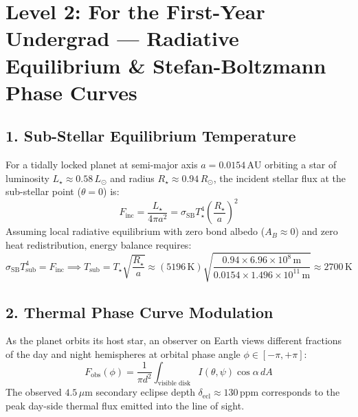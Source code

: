 \documentclass[11pt,a4paper]{article}
\begin{document}
\section*{Level 2: For the First-Year Undergrad — Radiative Equilibrium \& Stefan-Boltzmann Phase Curves}

\subsection*{1. Sub-Stellar Equilibrium Temperature}
For a tidally locked planet at semi-major axis $a = 0.0154\,\text{AU}$ orbiting a star of luminosity $L_\star \approx 0.58\,L_\odot$ and radius $R_\star \approx 0.94\,R_\odot$, the incident stellar flux at the sub-stellar point ($\theta = 0$) is:
\begin{equation}
F_{\text{inc}} = \frac{L_\star}{4\pi a^2} = \sigma_{\text{SB}} T_\star^4 \left(\frac{R_\star}{a}\right)^2
\end{equation}
Assuming local radiative equilibrium with zero bond albedo ($A_B \approx 0$) and zero heat redistribution, energy balance requires:
\begin{equation}
\sigma_{\text{SB}} T_{\text{sub}}^4 = F_{\text{inc}} \implies T_{\text{sub}} = T_\star \sqrt{\frac{R_\star}{a}} \approx (5196\,\text{K}) \sqrt{\frac{0.94 \times 6.96 \times 10^8\,\text{m}}{0.0154 \times 1.496 \times 10^{11}\,\text{m}}} \approx 2700\,\text{K}
\end{equation}

\subsection*{2. Thermal Phase Curve Modulation}
As the planet orbits its host star, an observer on Earth views different fractions of the day and night hemispheres at orbital phase angle $\phi \in [-\pi, +\pi]$:
\begin{equation}
F_{\text{obs}}(\phi) = \frac{1}{\pi d^2} \int_{\text{visible disk}} I(\theta, \psi) \cos\alpha\,dA
\end{equation}
The observed $4.5\,\mu\mathrm{m}$ secondary eclipse depth $\delta_{\text{ecl}} \approx 130\,\text{ppm}$ corresponds to the peak day-side thermal flux emitted into the line of sight.

\newpage

\end{document}
